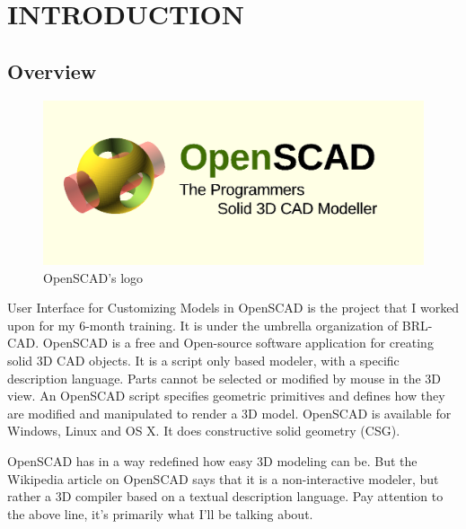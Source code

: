 \documentclass[12pt,includeheadfoot,a4paper]{report}
\begin{document}
	
	\begin{screen}
		\ppttitle
	\end{screen}
\thispagestyle{empty} 
\pagetitle
\newpage
{}
\cfoot{\thepage}


\newpage


\tableofcontents
\listoffigures
{}
\cfoot{\thepage}

\chapter{INTRODUCTION}
\section{Overview}
\begin{figure}[H] 
	\centering \includegraphics[scale=0.31]{images/openscad.png}
	\caption{OpenSCAD's logo}
	\label{fig:openscadlogo}
\end{figure}

User Interface for Customizing Models in OpenSCAD is the project that I worked upon for my 6-month training. It is under the umbrella organization of BRL-CAD. OpenSCAD is a free and Open-source software application for creating solid 3D CAD objects. It is a script only based modeler, with a specific description language. Parts cannot be selected or modified by mouse in the 3D view. An OpenSCAD script specifies geometric primitives and defines how they are modified and manipulated to render a 3D model. OpenSCAD is available for Windows, Linux and OS X. It does constructive solid geometry (CSG).

OpenSCAD has in a way redefined how easy 3D modeling can be. But the Wikipedia article on OpenSCAD says that it is a non-interactive modeler, but rather a 3D compiler based on a textual description language. Pay attention to the above line, it’s primarily what I’ll be talking about.
\end{document}
